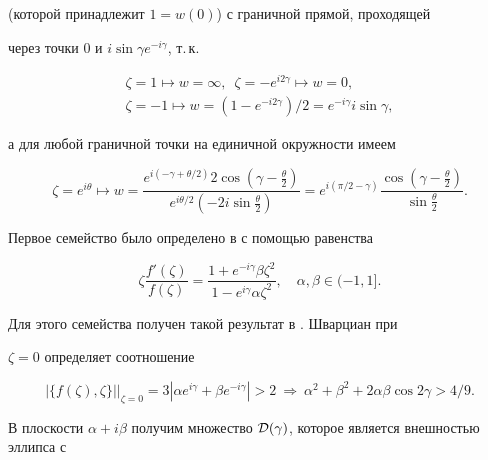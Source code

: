 (которой принадлежит $1=w(0)$) с граничной прямой, проходящей


через точки $0$ и $i\sin\gamma e^{-i\gamma}$, т.\,к.


\begin{gather*}


\zeta=1\mapsto w=\infty,\ \;


\zeta=-e^{i2\gamma}\mapsto w=0,\\


\zeta=-1\mapsto w=(1-e^{-i2\gamma})/2=e^{-i\gamma}i\sin\gamma,


\end{gather*}


а для любой граничной точки на единичной окружности имеем


$$


\zeta=e^{i\theta}\mapsto w=\frac{e^{i(-\gamma+\theta/2)}


2\cos(\gamma-\frac{\theta}{2})}


{e^{i\theta/2}(-2i\sin\frac{\theta}{2})} =


e^{i(\pi/2-\gamma)}\frac{\cos(\gamma-\frac{\theta}{2})}


{\sin\frac{\theta}{2}}.


$$





Первое семейство было определено в \cite{4} с помощью равенства


\begin{equation}\label{14}


\zeta\frac{f'(\zeta)}{f(\zeta)}=


\frac{1+e^{-i\gamma}\beta\zeta^2}{1-e^{i\gamma}\alpha\zeta^2},


\quad \alpha,\beta\in(-1,1].


\end{equation}


Для этого семейства получен такой результат в \cite{4}. Шварциан при


$\zeta=0$ определяет соотношение


$$


|\{f(\zeta),\zeta \}| \big|_{\zeta=0}=


3|\alpha e^{i\gamma}+\beta e^{-i\gamma}|>2


\ \Rightarrow \


\alpha^2+\beta^2+2\alpha\beta\cos2\gamma>4/9.


$$


В плоскости $\alpha+i\beta$ получим множество ${\cal


D}(\gamma)$, которое является внешностью эллипса с


